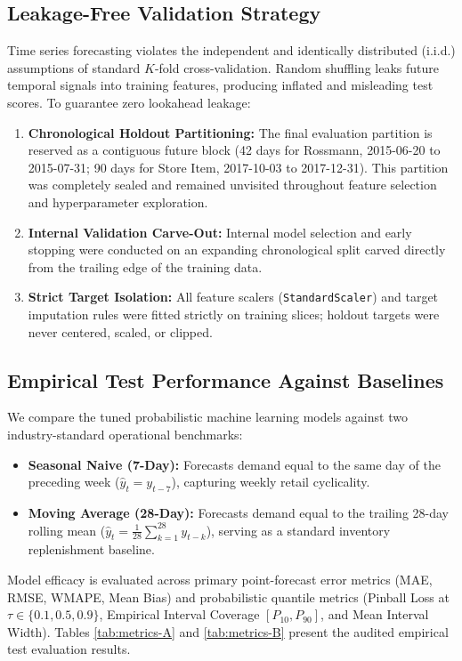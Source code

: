 \documentclass[11pt,a4paper]{article}
\begin{document}
\subsection{Leakage-Free Validation Strategy}
Time series forecasting violates the independent and identically distributed (i.i.d.) assumptions of standard $K$-fold cross-validation. Random shuffling leaks future temporal signals into training features, producing inflated and misleading test scores. To guarantee zero lookahead leakage:
\begin{enumerate}
    \item \textbf{Chronological Holdout Partitioning:} The final evaluation partition is reserved as a contiguous future block (42 days for Rossmann, 2015-06-20 to 2015-07-31; 90 days for Store Item, 2017-10-03 to 2017-12-31). This partition was completely sealed and remained unvisited throughout feature selection and hyperparameter exploration.
    \item \textbf{Internal Validation Carve-Out:} Internal model selection and early stopping were conducted on an expanding chronological split carved directly from the trailing edge of the training data.
    \item \textbf{Strict Target Isolation:} All feature scalers (\texttt{StandardScaler}) and target imputation rules were fitted strictly on training slices; holdout targets were never centered, scaled, or clipped.
\end{enumerate}

\subsection{Empirical Test Performance Against Baselines}
We compare the tuned probabilistic machine learning models against two industry-standard operational benchmarks:
\begin{itemize}
    \item \textbf{Seasonal Naive (7-Day):} Forecasts demand equal to the same day of the preceding week ($\hat{y}_t = y_{t-7}$), capturing weekly retail cyclicality.
    \item \textbf{Moving Average (28-Day):} Forecasts demand equal to the trailing 28-day rolling mean ($\hat{y}_t = \frac{1}{28}\sum_{k=1}^{28} y_{t-k}$), serving as a standard inventory replenishment baseline.
\end{itemize}

Model efficacy is evaluated across primary point-forecast error metrics (MAE, RMSE, WMAPE, Mean Bias) and probabilistic quantile metrics (Pinball Loss at $\tau \in \{0.1, 0.5, 0.9\}$, Empirical Interval Coverage $[P_{10}, P_{90}]$, and Mean Interval Width). Tables \ref{tab:metrics-A} and \ref{tab:metrics-B} present the audited empirical test evaluation results.
\end{document}
